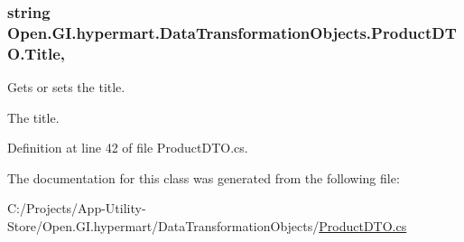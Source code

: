 \subsubsection[{Title}]{\setlength{\rightskip}{0pt plus 5cm}string Open.\+G\+I.\+hypermart.\+Data\+Transformation\+Objects.\+Product\+D\+T\+O.\+Title\hspace{0.3cm}{\ttfamily [get]}, {\ttfamily [set]}}\label{class_open_1_1_g_i_1_1hypermart_1_1_data_transformation_objects_1_1_product_d_t_o_a6f03b28697c295061d5c914d5598efef}


Gets or sets the title. 

The title. 

Definition at line 42 of file Product\+D\+T\+O.\+cs.



The documentation for this class was generated from the following file\+:\begin{DoxyCompactItemize}
\item 
C\+:/\+Projects/\+App-\/\+Utility-\/\+Store/\+Open.\+G\+I.\+hypermart/\+Data\+Transformation\+Objects/\hyperlink{_product_d_t_o_8cs}{Product\+D\+T\+O.\+cs}\end{DoxyCompactItemize}
